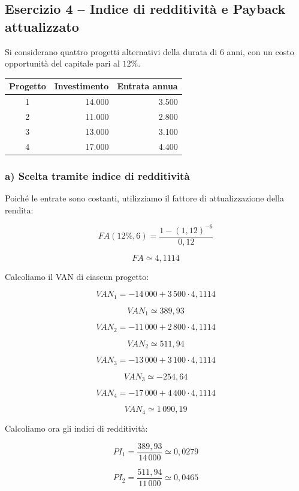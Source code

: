 \subsection{Esercizio 4 -- Indice di redditività e Payback attualizzato}

\noindent Si considerano quattro progetti alternativi
della durata di 6 anni, con un costo opportunità
del capitale pari al $12\%$.

\begin{center}
\begin{tabular}{|c|r|r|}
\hline
\textbf{Progetto} & \textbf{Investimento} &
\textbf{Entrata annua} \\
\hline
1 & 14.000 & 3.500 \\
2 & 11.000 & 2.800 \\
3 & 13.000 & 3.100 \\
4 & 17.000 & 4.400 \\
\hline
\end{tabular}
\end{center}

\subsubsection*{a) Scelta tramite indice di redditività}

\noindent Poiché le entrate sono costanti, utilizziamo
il fattore di attualizzazione della rendita:

\[
FA(12\%,6)
=\frac{1-(1{,}12)^{-6}}{0{,}12}
\]

\[
\boxed{FA\simeq4{,}1114}
\]

\noindent Calcoliamo il VAN di ciascun progetto:

\[
VAN_1=-14\,000+3\,500\cdot4{,}1114
\]

\[
\boxed{VAN_1\simeq389{,}93}
\]

\[
VAN_2=-11\,000+2\,800\cdot4{,}1114
\]

\[
\boxed{VAN_2\simeq511{,}94}
\]

\[
VAN_3=-13\,000+3\,100\cdot4{,}1114
\]

\[
\boxed{VAN_3\simeq-254{,}64}
\]

\[
VAN_4=-17\,000+4\,400\cdot4{,}1114
\]

\[
\boxed{VAN_4\simeq1\,090{,}19}
\]

\noindent Calcoliamo ora gli indici di redditività:

\[
PI_1=\frac{389{,}93}{14\,000}\simeq0{,}0279
\]

\[
PI_2=\frac{511{,}94}{11\,000}\simeq0{,}0465
\]

